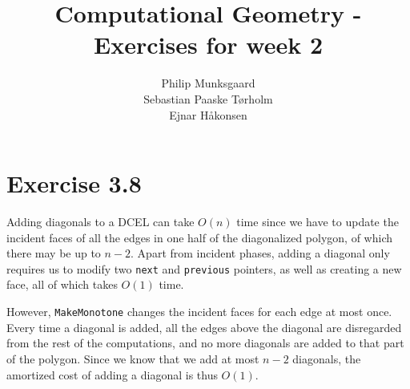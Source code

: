 \documentclass[11pt,a4paper]{article}
\title{Computational Geometry - Exercises for week 2}
\author{Philip Munksgaard\\Sebastian Paaske Tørholm \\ Ejnar Håkonsen}
\begin{document}
\maketitle

\section{Exercise 3.8}

Adding diagonals to a DCEL can take $O(n)$ time since we have to
update the incident faces of all the edges in one half of the
diagonalized polygon, of which there may be up to $n-2$. Apart from
incident phases, adding a diagonal only requires us to modify two
\texttt{next} and \texttt{previous} pointers, as well as creating a
new face, all of which takes $O(1)$ time.

However, \texttt{MakeMonotone} changes the incident faces for each
edge at most once. Every time a diagonal is added, all the edges above
the diagonal are disregarded from the rest of the computations, and no
more diagonals are added to that part of the polygon. Since we know
that we add at most $n-2$ diagonals, the amortized cost of adding a
diagonal is thus $O(1)$.
\end{document}
